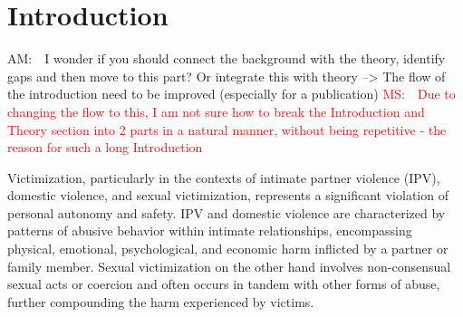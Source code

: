 \documentclass[11pt]{article}
\newcommand{\ms}[1]{\textcolor{red}{{MS:~~#1}}}
\newcommand{\am}[1]{\textcolor{red!80!black!40}{{AM:~~#1}}}
\begin{document}



\section{Introduction}


\am{I wonder if you should connect the background with the theory, identify gaps and then move to this part? Or integrate this with theory --> The flow of the introduction need to be improved (especially for a publication)} 
\ms{Due to changing the flow to this, I am not sure how to break the Introduction and Theory section into 2 parts in a natural manner, without being repetitive - the reason for such a long Introduction}

Victimization, particularly in the contexts of intimate partner violence (IPV), domestic violence, and sexual victimization, represents a significant violation of personal autonomy and safety. 
IPV and domestic violence are characterized by patterns of abusive behavior within intimate relationships, encompassing physical, emotional, psychological, and economic harm inflicted by a partner or family member. 
Sexual victimization on the other hand involves non-consensual sexual acts or coercion and often occurs in tandem with other forms of abuse, further compounding the harm experienced by victims. 
\end{document}
